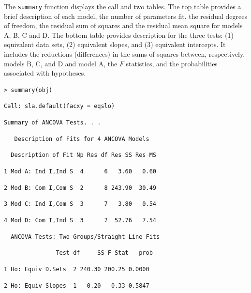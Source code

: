 \documentclass[11pt, oneside]{article}   	%
\begin{document}
\vspace{4 mm}

\noindent The \texttt{summary} function displays the call and two tables.  The top table provides a brief description of each model, the number of parameters fit, the residual degrees of freedom, the residual sum of squares and the residual mean square for models A, B, C and D.  The bottom table provides description for the three tests: (1) equivalent data sets, (2) equivalent slopes, and (3) equivalent intercepts.  It includes the reductions (differences) in the sums of squares  between, respectively, models B, C, and D and model A, the $  F $ statistics, and the probabilities associated with hypotheses.  

\vspace{2 mm}

\noindent \texttt{> summary(obj)}

\vspace{2mm}

\noindent \texttt{Call:  sla.default(facxy = eqslo)}
\vspace{2 mm}

\noindent \texttt{Summary of ANCOVA Tests. . .}
\vspace{2 mm}

\noindent \texttt{~~  Description of Fits for 4 ANCOVA Models} 

\noindent \texttt{~  Description of Fit Np Res df Res SS Res MS}

\noindent \texttt{1 Mod A: Ind I,Ind S  ~4 ~~~~      6  ~ 3.60 ~  0.60}

\noindent \texttt{2 Mod B: Com I,Com S  ~2 ~~~~       8 243.90~  30.49}

\noindent \texttt{3 Mod C: Ind I,Com S ~3 ~~~~       7 ~  3.80~~   0.54}

\noindent \texttt{4 Mod D: Com I,Ind S  ~3 ~~~~      7  ~52.76  ~ 7.54}

\vspace{2 mm}

\noindent \texttt{~ ANCOVA Tests: Two Groups/Straight Line Fits }

\vspace{2 mm}

\noindent \texttt{~~~~~~~~~~~~~~              Test df~~~~     SS F Stat~~   prob}

\noindent \texttt{1 Ho: Equiv D.Sets~  2 240.30 200.25 0.0000}

\noindent \texttt{2 Ho: Equiv Slopes~  1~~   0.20~~   0.33 0.5847}
\end{document}
